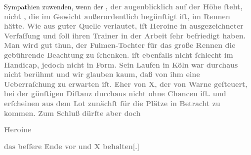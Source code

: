 {{                  Sympathien zuwenden, wenn der }}\textcolor{gray}{\textbf{}}\textcolor{gray}{\textbf{, der augenblicklich auf der Höhe ſteht, nicht
                     , die im Gewicht außerordentlich begünſtigt
                  iſt, im Rennen hätte. Wie aus guter Quelle verlautet, iſt Heroine in
                  ausgezeichneter Verfaſſung und ſoll ihren Trainer in der Arbeit ſehr befriedigt
                  haben. Man wird gut thun, der Fulmen-Tochter für das große Rennen die gebührende
                  Beachtung zu ſchenken.  iſt ebenfalls nicht
                  ſchlecht im Handicap, jedoch nicht in Form. Sein Laufen in Köln war durchaus nicht berühmt und wir glauben kaum, daß
                  von ihm eine Ueberraſchung zu erwarten iſt. Eher von \textsc{X},
                  der von Warne geſteuert, bei der günſtigen
                  Diſtanz durchaus nicht ohne Chancen iſt.  und  erſcheinen aus dem Lot zunächſt für die Plätze in
                  Betracht zu kommen. Zum Schluß dürfte aber doch}}\pend
           
\pstart
           \centering{}\textcolor{gray}{\textbf{\textbf{Heroine}}}\pend
           
\pstart
           \textcolor{gray}{\textbf{das beſſere Ende vor}}{ }\textcolor{gray}{\textbf{}}\textcolor{gray}{\textbf{{ }und \textsc{X}
                     behalten{[}.{]}}}\pend
           \endnumbering{}  
      